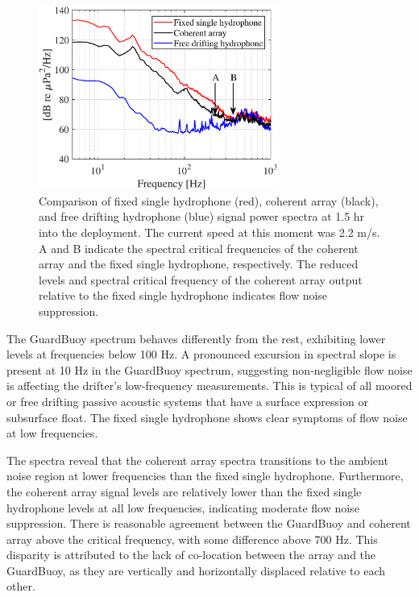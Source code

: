 \documentclass[12pt,journal,onecolumn]{IEEEtran}
\begin{document}
\begin{figure}[!t]
	\begin{center}
		\includegraphics[width=0.7\textwidth]{figure8.eps} 
	\end{center}
	\caption[Comparison of hydrophone, coherent array, and guard buoy signals]{
	\label{f:comparison}
	Comparison of fixed single hydrophone (red), coherent array (black), and free drifting hydrophone (blue) signal power spectra at 1.5 hr into the deployment. The current speed at this moment was 2.2 m/s. A and B indicate the spectral critical frequencies of the coherent array and the fixed single hydrophone, respectively. The reduced levels and spectral critical frequency of the coherent array output relative to the fixed single hydrophone indicates flow noise suppression.  }
\end{figure}
The GuardBuoy spectrum behaves differently from the rest, exhibiting lower levels at frequencies below 100 Hz. A pronounced excursion in spectral slope is present at 10 Hz in the GuardBuoy spectrum, suggesting non-negligible flow noise is affecting the drifter's low-frequency measurements. This is typical of all moored or free drifting passive acoustic systems that have a surface expression or subsurface float. The fixed single hydrophone shows clear symptoms of flow noise at low frequencies. 

The spectra reveal that the coherent array spectra transitions to the ambient noise region at lower frequencies than the fixed single hydrophone. 
Furthermore, the coherent array signal levels are relatively lower than the fixed single hydrophone levels at all low frequencies, indicating moderate flow noise suppression. 
There is reasonable agreement between the GuardBuoy and coherent array above the critical frequency, with some difference above 700 Hz. This disparity is attributed to the lack of co-location between the array and the GuardBuoy, as they are vertically and horizontally displaced relative to each other.
\end{document}
